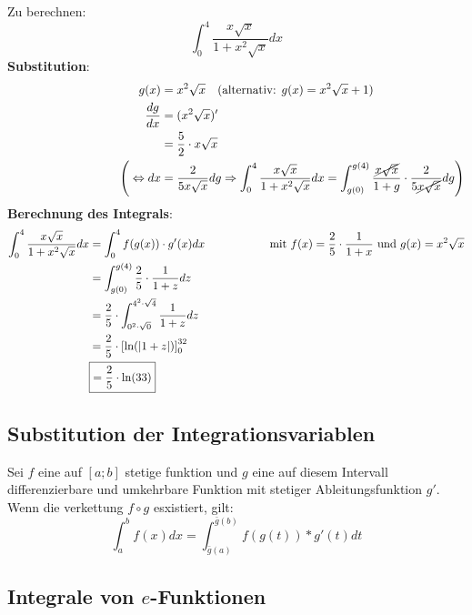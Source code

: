 \documentclass[main.tex]{subfiles}
\begin{document}
\begin{Beispiel}
    Zu berechnen: $$\int_0^4 \dfrac{x\sqrt{x}}{1 + x^2\sqrt{x}} dx$$
    \textbf{Substitution}:
    \begin{align*}
        \quad \qquad \qquad \qquad \qquad \qquad
        g(x) &= x^2\sqrt{x} \quad (\text{alternativ: } g(x) = x^2\sqrt{x} + 1) \\
        \dfrac{dg}{dx} &= (x^2\sqrt{x})' \\
                          &= \dfrac{5}{2} \cdot x\sqrt{x} \\
        \Bigg(\Leftrightarrow dx &= \dfrac{2}{5x\sqrt{x}}dg \Rightarrow \int_0^4 \dfrac{x\sqrt{x}}{1 + x^2\sqrt{x}} dx = \int_{g(0)}^{g(4)} \dfrac{\cancel{x\sqrt{x}}}{1 + g} \cdot \dfrac{2}{5\cancel{x\sqrt{x}}}dg\Bigg)
    \end{align*}
    \textbf{Berechnung des Integrals}:
    \begin{align*}
        \int_0^4 \dfrac{x\sqrt{x}}{1 + x^2\sqrt{x}} dx &= \int_0^4 f(g(x))\cdot g'(x)dx \text{\hspace{2cm}mit $f(x)=\dfrac{2}{5} \cdot \dfrac{1}{1+x}$ und $g(x) = x^2\sqrt{x}$}\\
        &= \int_{g(0)}^{g(4)} \dfrac{2}{5} \cdot\dfrac{1}{1 + z}dz \\
        &= \dfrac{2}{5} \cdot \int_{0^2\cdot\sqrt{0}}^{4^2\cdot\sqrt{4}} \dfrac{1}{1 + z}dz \\
        &= \dfrac{2}{5} \cdot \left[\ln(|1 + z|)\right]_0^{32} \\
        &\boxed{= \dfrac{2}{5} \cdot \ln(33)}
    \end{align*}
\end{Beispiel}


\subsection{Substitution der Integrationsvariablen}

\begin{Theorem}
  Sei $f$ eine auf $[a;b]$ stetige funktion und $g$ eine auf diesem Intervall differenzierbare und umkehrbare Funktion mit stetiger
  Ableitungsfunktion $g'$. Wenn die verkettung $f \circ g$ esxistiert, gilt:
  $$\int_a^b f(x)dx=\int_{\bar g (a)}^{\bar g (b)}f(g(t))*g'(t)dt$$
\end{Theorem}


\subsection{Integrale von $e$-Funktionen}
\end{document}
